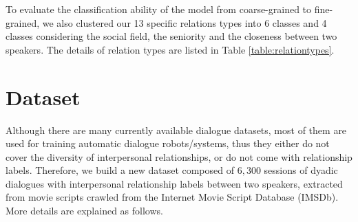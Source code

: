 \documentclass[letterpaper]{article} \usepackage{aaai21}  \usepackage{times}  \usepackage{helvet} \usepackage{courier}  \usepackage[hyphens]{url}  \usepackage{graphicx} \usepackage{xcolor}
\begin{document}
To evaluate the classification ability of the model from coarse-grained to fine-grained, we also clustered our 13 specific 
relations types into 6 classes and 4 classes considering the social field, the seniority 
and the closeness between two speakers. The details of relation types are listed
in Table \ref{table:relationtypes}. 
\section{Dataset}
\label{sec:dataset}
Although there are many currently available dialogue datasets, 
most of them are used for training automatic dialogue robots/systems, 
thus they either do not cover the diversity of interpersonal relationships, 
or do not come with relationship labels.
Therefore, we build a new dataset 
composed of $6,300$ sessions of dyadic dialogues with 
interpersonal relationship labels between two speakers, 
extracted from movie scripts crawled from 
the Internet Movie Script Database (IMSDb). More details are explained as follows. 
\end{document}

